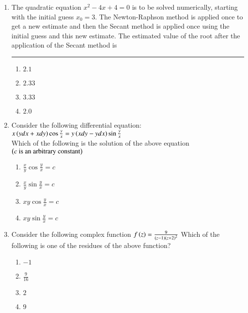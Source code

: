 \documentclass[journal]{IEEEtran}
\begin{document}
\begin{enumerate}
{\begin{multicols}{4}
\begin{enumerate}
\item $1.5$ and $2.5$
\item $0.5$ and $2.5$
\item $1.0$ and $3.0$
\item $1.0$ and $2.0$
\end{enumerate}
\end{multicols}
}
\item{
The quadratic equation $x^2 - 4x + 4 = 0$ is to be solved numerically, starting with the initial guess $x_0 = 3$. The Newton-Raphson method is applied once to get a new estimate and then the Secant method is applied once using the initial guess and this new estimate. The estimated value of the root after the application of the Secant method is \rule{3cm}{0.15mm}
\begin{multicols}{4}
\begin{enumerate}
\item $2.1$
\item $2.33$
\item $3.33$
\item $2.0$
\end{enumerate}
\end{multicols}
}
\item{
Consider the following differential equation:$x\left(ydx+xdy\right)\cos\frac{y}{x}=y\left(xdy-ydx\right)\sin\frac{y}{x}$\\
Which of the following is the solution of the above equation $\left(c\text{ is an arbitrary constant}\right)$
\begin{multicols}{4}
\begin{enumerate}
\item $\frac{x}{y}\cos\frac{y}{x}=c$
\item $\frac{x}{y}\sin\frac{y}{x}=c$
\item $xy\cos\frac{y}{x}=c$
\item $xy\sin\frac{y}{x}=c$
\end{enumerate}
\end{multicols}
}
\item{
Consider the following complex function $f\left(z\right)=\frac{9}{\left(z-1\right)\left(z+2\right)^2}$ Which of the following is one of the residues of the above function?
\begin{multicols}{4}
    \begin{enumerate}
        \item $-1$
        \item $\frac{9}{16}$
        \item $2$
        \item $9$
    \end{enumerate}
\end{multicols}
}
\end{enumerate}
\end{document}
